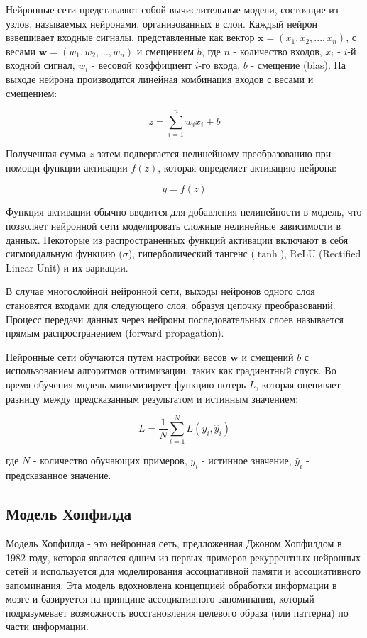 Нейронные сети представляют собой вычислительные модели, состоящие из узлов, называемых нейронами, организованных в слои. Каждый нейрон взвешивает входные сигналы, представленные как вектор \( \mathbf{x} = (x_1, x_2, ..., x_n) \), с весами \( \mathbf{w} = (w_1, w_2, ..., w_n) \) и смещением \( b \), где \( n \) - количество входов, \( x_i \) - \( i \)-й входной сигнал, \( w_i \) - весовой коэффициент \( i \)-го входа, \( b \) - смещение (bias). На выходе нейрона производится линейная комбинация входов с весами и смещением:

\[ z = \sum_{i=1}^{n} w_i x_i + b \]

Полученная сумма \( z \) затем подвергается нелинейному преобразованию при помощи функции активации \( f(z) \), которая определяет активацию нейрона:

\[ y = f(z) \]

Функция активации обычно вводится для добавления нелинейности в модель, что позволяет нейронной сети моделировать сложные нелинейные зависимости в данных. Некоторые из распространенных функций активации включают в себя сигмоидальную функцию (\( \sigma \)), гиперболический тангенс (\( \tanh \)), ReLU (Rectified Linear Unit) и их вариации.

В случае многослойной нейронной сети, выходы нейронов одного слоя становятся входами для следующего слоя, образуя цепочку преобразований. Процесс передачи данных через нейроны последовательных слоев называется прямым распространением (forward propagation).

Нейронные сети обучаются путем настройки весов \( \mathbf{w} \) и смещений \( b \) с использованием алгоритмов оптимизации, таких как градиентный спуск. Во время обучения модель минимизирует функцию потерь \( L \), которая оценивает разницу между предсказанным результатом и истинным значением:

\[ L = \frac{1}{N} \sum_{i=1}^{N} L(y_i, \hat{y}_i) \]

где \( N \) - количество обучающих примеров, \( y_i \) - истинное значение, \( \hat{y}_i \) - предсказанное значение.


\subsection{Модель Хопфилда}

Модель Хопфилда - это нейронная сеть, предложенная Джоном Хопфилдом в 1982 году, которая является одним из первых примеров рекуррентных нейронных сетей и используется для моделирования ассоциативной памяти и ассоциативного запоминания. Эта модель вдохновлена концепцией обработки информации в мозге и базируется на принципе ассоциативного запоминания, который подразумевает возможность восстановления целевого образа (или паттерна) по части информации.

